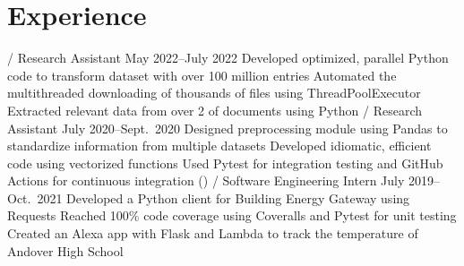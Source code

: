 \section{Experience}
\begin{outline}
     / Research Assistant
    \hfill May 2022--July 2022
        \1 Developed optimized, parallel Python code to transform dataset with over 100 million entries
        \1 Automated the multithreaded downloading of thousands of files using ThreadPoolExecutor
        \1 Extracted relevant data from over 2  of   documents using Python
     / Research Assistant
    \hfill July 2020--Sept.\ 2020
        \1 Designed preprocessing module using Pandas to standardize information from multiple datasets
            \2 Developed idiomatic, efficient code using vectorized functions
            \2 Used Pytest for integration testing and GitHub Actions for continuous integration ()
     / Software Engineering Intern
    \hfill July 2019--Oct.\ 2021
        \1 Developed a Python client for Building Energy Gateway using Requests
            \2 Reached 100\% code coverage using Coveralls and Pytest for unit testing
        \1 Created an Alexa app with Flask and  Lambda to track the temperature of Andover High School
\end{outline}

